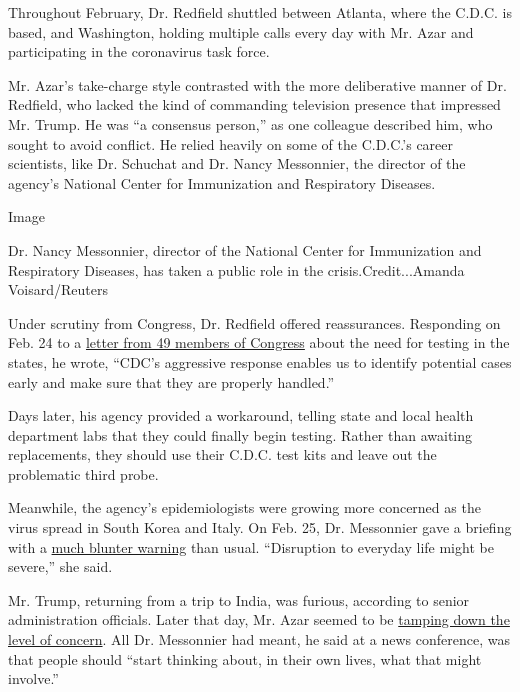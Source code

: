 Throughout February, Dr. Redfield shuttled between Atlanta, where the
C.D.C. is based, and Washington, holding multiple calls every day with
Mr. Azar and participating in the coronavirus task force.

Mr. Azar's take-charge style contrasted with the more deliberative
manner of Dr. Redfield, who lacked the kind of commanding television
presence that impressed Mr. Trump. He was ``a consensus person,'' as one
colleague described him, who sought to avoid conflict. He relied heavily
on some of the C.D.C.'s career scientists, like Dr. Schuchat and Dr.
Nancy Messonnier, the director of the agency's National Center for
Immunization and Respiratory Diseases.

Image

Dr. Nancy Messonnier, director of the National Center for Immunization
and Respiratory Diseases, has taken a public role in the
crisis.Credit...Amanda Voisard/Reuters

Under scrutiny from Congress, Dr. Redfield offered reassurances.
Responding on Feb. 24 to a
\href{https://kilmer.house.gov/imo/media/doc/Letter\%20to\%20CDC\%20Director\%20Redfield\%202.3.2020.pdf}{letter
from 49 members of Congress} about the need for testing in the states,
he wrote, ``CDC's aggressive response enables us to identify potential
cases early and make sure that they are properly handled.''

Days later, his agency provided a workaround, telling state and local
health department labs that they could finally begin testing. Rather
than awaiting replacements, they should use their C.D.C. test kits and
leave out the problematic third probe.

Meanwhile, the agency's epidemiologists were growing more concerned as
the virus spread in South Korea and Italy. On Feb. 25, Dr. Messonnier
gave a briefing with a
\href{https://www.nytimes3xbfgragh.onion/2020/03/07/us/politics/trump-coronavirus.html}{much
blunter warning} than usual. ``Disruption to everyday life might be
severe,'' she said.

Mr. Trump, returning from a trip to India, was furious, according to
senior administration officials. Later that day, Mr. Azar seemed to be
\href{https://www.statnews.com/2020/02/25/cdc-expects-community-spread-of-coronavirus-as-top-official-warns-disruptions-could-be-severe/}{tamping
down the level of concern}. All Dr. Messonnier had meant, he said at a
news conference, was that people should ``start thinking about, in their
own lives, what that might involve.''

